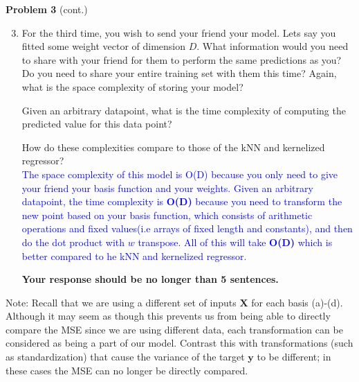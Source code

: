 \documentclass[submit]{harvardml}
\begin{document}
\newpage
\begin{framed}
\noindent\textbf{Problem 3} (cont.)\\
\begin{enumerate}
\setcounter{enumi}{2}
\item For the third time, you wish to send your friend your model. Lets say you fitted some weight vector of dimension $D$. What information would you need to share with your friend for them to perform the same predictions as you? Do you need to share your entire training set with them this time? Again, what is the space complexity of storing your model?

Given an arbitrary datapoint, what is the time complexity of computing the predicted value for this data point?

How do these complexities compare to those of the kNN and kernelized regressor?\\
\textcolor{blue}{
The space complexity of this model is O(D) because you only need to give your friend your basis function and your weights. Given an arbitrary datapoint, the time complexity is \textbf{O(D)} because you need to transform the new point based on your basis function, which consists of arithmetic operations and fixed values(i.e arrays of fixed length and constants), and then do the dot product with $w$ transpose. All of this will take \textbf{O(D)} which is better compared to he kNN and kernelized regressor.
}

\textbf{Your response should be no longer than 5 sentences.}

\end{enumerate}
Note:
Recall that we are using a 
different set of inputs $\mathbf{X}$ for each basis (a)-(d). 
Although it may seem as though this prevents us from being able 
to directly compare the MSE since we are using different data, 
each transformation can be considered as being a part of our model. 
Contrast this with transformations (such as standardization) that cause the variance
of the target $\mathbf{y}$ to be different; in these cases the
MSE can no longer be directly compared.

\end{framed}
\end{document}
